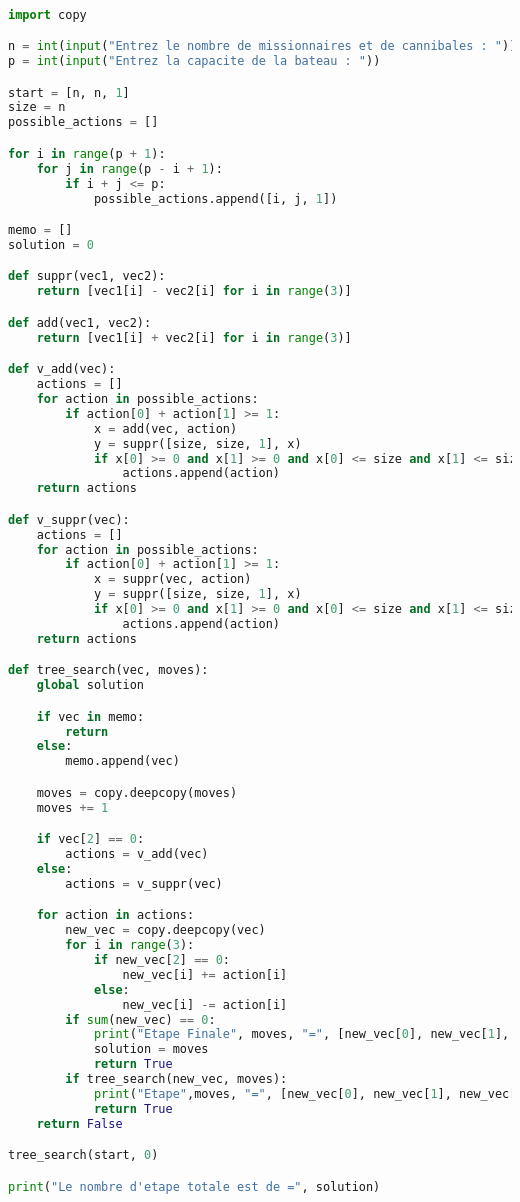 \documentclass{article}
\begin{document}
\begin{lstlisting}[language=Python, caption=Code Python]

import copy

n = int(input("Entrez le nombre de missionnaires et de cannibales : "))
p = int(input("Entrez la capacite de la bateau : "))

start = [n, n, 1]
size = n
possible_actions = []

for i in range(p + 1):
    for j in range(p - i + 1):
        if i + j <= p:
            possible_actions.append([i, j, 1])

memo = []
solution = 0

def suppr(vec1, vec2):
    return [vec1[i] - vec2[i] for i in range(3)]

def add(vec1, vec2):
    return [vec1[i] + vec2[i] for i in range(3)]

def v_add(vec):
    actions = [] 
    for action in possible_actions:
        if action[0] + action[1] >= 1:
            x = add(vec, action) 
            y = suppr([size, size, 1], x) 
            if x[0] >= 0 and x[1] >= 0 and x[0] <= size and x[1] <= size and (x[0] >= x[1] or x[0] == 0) and (y[0] >= y[1] or y[0] == 0):
                actions.append(action)        
    return actions 

def v_suppr(vec):
    actions = []
    for action in possible_actions:
        if action[0] + action[1] >= 1: 
            x = suppr(vec, action)
            y = suppr([size, size, 1], x)
            if x[0] >= 0 and x[1] >= 0 and x[0] <= size and x[1] <= size and (x[0] >= x[1] or x[0] == 0) and (y[0] >= y[1] or y[0] == 0):
                actions.append(action)
    return actions

def tree_search(vec, moves):
    global solution

    if vec in memo:
        return
    else:
        memo.append(vec)

    moves = copy.deepcopy(moves)
    moves += 1

    if vec[2] == 0: 
        actions = v_add(vec)
    else:
        actions = v_suppr(vec)

    for action in actions:
        new_vec = copy.deepcopy(vec)
        for i in range(3):
            if new_vec[2] == 0:
                new_vec[i] += action[i]
            else:
                new_vec[i] -= action[i]
        if sum(new_vec) == 0:
            print("Etape Finale", moves, "=", [new_vec[0], new_vec[1], new_vec[2], size-new_vec[0], size-new_vec[1]])
            solution = moves
            return True
        if tree_search(new_vec, moves):
            print("Etape",moves, "=", [new_vec[0], new_vec[1], new_vec[2], size-new_vec[0], size-new_vec[1]])
            return True
    return False

tree_search(start, 0)

print("Le nombre d'etape totale est de =", solution)



    
    
    
    
    
\end{lstlisting}
\end{document}
